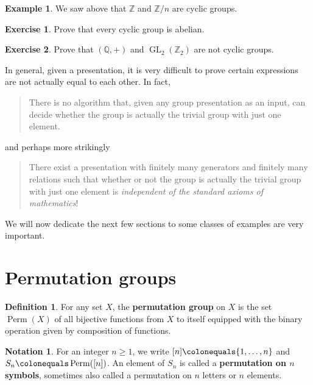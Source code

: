 \documentclass[12pt]{report}
\numberwithin{equation}{section}
\numberwithin{theorem}{chapter}
\theoremstyle{definition}
\newtheorem{definition}[theorem]{Definition}
\newtheorem{example}[theorem]{Example}
\newtheorem{exercise}{Exercise}
\newtheorem*{basic properties}{Basic Properties}
\newtheorem*{Important Remark}{Important Remark}
\newtheorem{notation}[theorem]{Notation}
\newcommand{\df}[1]{{\bf #1}\index{#1}}
\DeclareMathOperator{\Perm}{Perm}
\begin{document}
\begin{example}
	We saw above that $\mathbb{Z}$ and $\mathbb{Z}/n$ are cyclic groups.
\end{example}

\begin{exercise}
Prove that every cyclic group is abelian. 
\end{exercise}


\begin{exercise}
 Prove that $(\mathbb Q, +)$ and $\operatorname{GL}_2(\mathbb Z_2)$ are not cyclic groups.
\end{exercise}



In general, given a presentation, it is very difficult to prove certain expressions are not actually equal to each other. In fact,
\begin{quote}
There is no algorithm that, given any group presentation as an input, can decide whether the group is actually the trivial group with just one element.
\end{quote}
and perhaps more strikingly
\begin{quote}
There exist a presentation with finitely many generators and finitely many relations such that whether or not the group is actually the trivial group with just one element is {\em independent of the standard axioms of mathematics}!
\end{quote}










\vspace{2em}

We will now dedicate the next few sections to some classes of examples are very important.





\section{Permutation groups}


\begin{definition}
For any set $X$, the {\bf permutation group}  on $X$ is the set $\Perm(X)$ of all bijective functions from $X$ to itself equipped with the binary operation given by composition of functions.
\end{definition}

\begin{notation}\index{$[n]$}
For an integer $n \geqslant 1$, we write $[n] \colonequals \{1,\ldots,n\}$ and $S_n \colonequals \Perm([n])$. An element of $S_n$ is called a \df{permutation on $n$ symbols}, sometimes also called a permutation on $n$ letters or $n$ elements. 
\end{notation}
\end{document}
